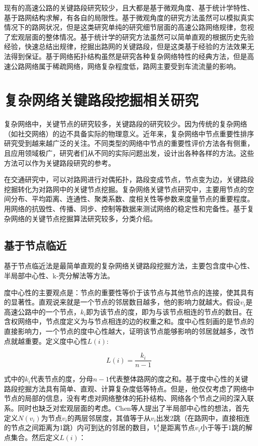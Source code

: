 	现有的高速公路的关键路段研究较少，且大都是基于微观角度、基于统计学特性、基于路网结构求解，有各自的局限性。基于微观角度的研究方法虽然可以模拟真实情况下的路网状况，但是这类研究单纯的研究细节层面的高速公路网络规律，忽视了宏观层面的整体情况。基于统计学的研究方法虽然可以简单直观的根据历史先验经验，快速总结出规律，挖掘出路网的关键路段，但是这类基于经验的方法效果无法得到保证。基于网络拓扑结构虽然是研究各种复杂网络特性的经典方法，但是高速公路网络属于稀疏网络，网络复杂程度低，路网主要受到车流流量的影响。

\section{复杂网络关键路段挖掘相关研究}
	复杂网络中，关键节点的研究较多，关键路段的研究较少。因为传统的复杂网络（如社交网络）的边不具备实际的物理意义。近年来，复杂网络中节点重要性排序研究受到越来越广泛的关注。不同类型的网络中节点的重要性评价方法各有侧重，且应用领域极广，研究者们从不同的实际问题出发，设计出各种各样的方法。这些方法可以作为关键路段研究的参考。

	在交通研究中，可以对路网进行对偶拓扑，路段变成节点，节点变为边，关键路段挖掘转化为对路网中的关键节点挖掘。复杂网络关键节点研究中，主要用节点的空间分布、平均距离、连通性、聚类系数、度相关性等参数来度量节点的重要程度。用网络的抗毁性、传播、同步、控制等数据来测试网络的稳定性和完备性。基于复杂网络的关键节点挖掘算法研究较多，分类介绍。
				
	\subsection{基于节点临近}
		基于节点临近法是最简单直观的复杂网络关键路段挖掘方法，主要包含度中心性、半局部中心性、k-壳分解法等方法。

		度中心性的主要观点是：节点的重要性等价于该节点与其他节点的连接，使其具有的显著性。直观说来就是一个节点的邻居数目越多，他的影响力就越大\parencite{Phillip1972Factoring}。假设$v_i$是高速公路中的一个节点，$k_i$即为该节点的度，即为与该节点相连的节点的数目。在含权网络中，节点度定义为与节点相连的边的权重之和。度中心性刻画的是节点的直接影响力，一个节点的度中心性越大，证明该节点能够影响的邻居就越多，改节点就越重要。定义度中心性$L(i)$:

		$$L(i)=\frac{k_i}{n-1}$$

		式中的$k_i$代表节点的度，分母$n-1$代表整体路网的度之和。基于度中心性的关键路段挖掘方法具有简单、直观、计算复杂度低等特点。但是，他仅仅考虑了网络中节点的局部的信息，没有考虑对网络整体的拓扑结构、网络各个节点之间的深入联系。同时也缺乏对宏观层面的考虑。Chen等人提出了半局部中心性的想法\parencite{Chen2012Identifying}，首先定义$N(v_i)$为节点$v_i$的两层邻居度，其值等于从$v_i$出发2跳（在路网中，直接相连的节点之间距离为1跳）内可到达的邻居的数目，$V_i^1$是距离节点$v_i$小于等于1跳的解点集合。然后定义$L(i)$：

